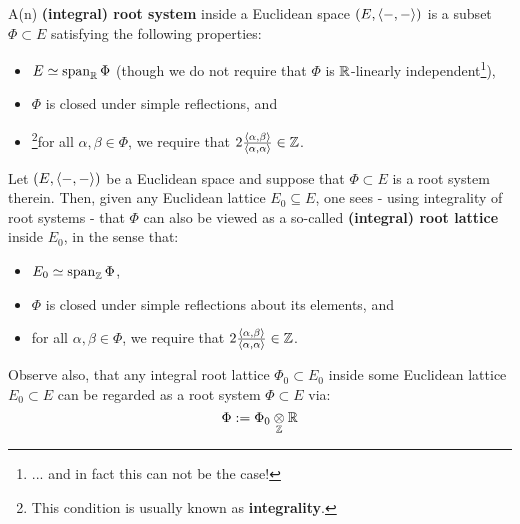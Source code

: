             \begin{definition} \label{def: root_systems}
                A(n) \textbf{(integral) root system} inside a Euclidean space $(E, \langle-, -\rangle)$ is a subset $\Phi \subset E$ satisfying the following properties:
                    \begin{itemize}
                        \item $E \simeq \operatorname{span}_{\mathbb{R}} \Phi$ (though we do not require that $\Phi$ is $\mathbb{R}$-linearly independent\footnote{... and in fact this can not be the case!}),
                        \item $\Phi$ is closed under simple reflections, and
                        \item \footnote{This condition is usually known as \textbf{integrality}.}for all $\alpha, \beta \in \Phi$, we require that $2\frac{\langle\alpha, \beta\rangle}{\langle\alpha, \alpha\rangle} \in \mathbb{Z}$.
                    \end{itemize}
            \end{definition}
            \begin{remark} \label{remark: root_lattices}
                Let $(E, \langle-, -\rangle)$ be a Euclidean space and suppose that $\Phi \subset E$ is a root system therein. Then, given any Euclidean lattice $E_0 \subseteq E$, one sees - using integrality of root systems - that $\Phi$ can also be viewed as a so-called \textbf{(integral) root lattice} inside $E_0$, in the sense that:
                    \begin{itemize}
                        \item $E_0 \simeq \operatorname{span}_{\mathbb{Z}} \Phi$,
                        \item $\Phi$ is closed under simple reflections about its elements, and
                        \item for all $\alpha, \beta \in \Phi$, we require that $2\frac{\langle\alpha, \beta\rangle}{\langle\alpha, \alpha\rangle} \in \mathbb{Z}$.
                    \end{itemize}
                Observe also, that any integral root lattice $\Phi_0 \subset E_0$ inside some Euclidean lattice $E_0 \subset E$ can be regarded as a root system $\Phi \subset E$ via:
                    $$\Phi := \Phi_0 \tensor_{\Z} \R$$
            \end{remark}
